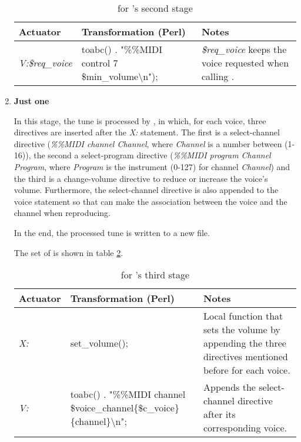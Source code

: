 \begin{enumerate}
  \begin{center}
    \begin{table}[h]
      \begin{tabular}{|p{2.25cm}|p{6.75cm}|p{6.5cm}|}
        \hline
        Actuator & Transformation (Perl) & Notes\\
        \hline
        \hline
        \emph{V:\$req\_voice} & toabc() . "\%\%MIDI control 7 \$min\_volume\textbackslash{}n"); &
        \emph{\$req\_voice} keeps the voice requested when calling \learningabc{}.
        \\
        \hline
      \end{tabular}
      \caption{\abcdtrules{} for \learningabc{}'s second stage}
      \label{tab:learning_abc_snd_stage}
    \end{table}
  \end{center}

  \item \textbf{Just one}

  In this stage, the tune is processed by \dt{}, in which, for each voice, three \midi{} directives
  are inserted after the \emph{X:} statement. The first is a select-channel directive
  (\emph{\%\%MIDI channel Channel}, where \emph{Channel} is a number between (1-16)), the second a
  select-program directive (\emph{\%\%MIDI program Channel Program}, where \emph{Program} is the
  instrument (0-127) for channel \emph{Channel}) and the third is a change-volume directive to
  reduce or increase the voice's volume. Furthermore, the select-channel directive is also appended
  to the voice statement so that \abctomidi{} can make the association between the voice and the
  channel when reproducing.

  In the end, the processed tune is written to a new \abc{} file.

  The set of \abcdtrules{} is shown in table \ref{tab:learning_abc_trd_stage}.

  \begin{center}
    \begin{table}[h]
      \begin{tabular}{|p{1.5cm}|p{7.5cm}|p{6.5cm}|}
        \hline
        Actuator & Transformation (Perl) & Notes\\
        \hline
        \hline
        \emph{X:} & set\_volume(); & Local function that sets the volume by appending the three
        \midi{} directives mentioned before for each voice.
        \\
        \hline

        \hline
        \emph{V:} & toabc() . "\%\%MIDI channel
        \$voice\_channel\{\$c\_voice\}\{channel\}\textbackslash{}n"; & Appends the select-channel
        directive after its corresponding voice.
        \\
        \hline
      \end{tabular}
      \caption{\abcdtrules{} for \learningabc{}'s third stage}
      \label{tab:learning_abc_trd_stage}
    \end{table}
  \end{center}
\end{enumerate}


